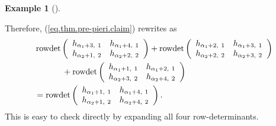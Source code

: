 \documentclass[numbers=enddot,12pt,final,onecolumn,notitlepage,english]{scrartcl}%
\theoremstyle{definition}
\newtheorem{exam}[theo]{Example}
\newenvironment{example}[1][]
{\begin{exam}[#1]\begin{leftbar}}
{\end{leftbar}\end{exam}}
\begin{document}
\begin{example}
Therefore, (\ref{eq.thm.pre-pieri.claim}) rewrites as%
\begin{align*}
&  \operatorname*{rowdet}\left(
\begin{array}
[c]{cc}%
h_{\alpha_{1}+3,\ 1} & h_{\alpha_{1}+4,\ 1}\\
h_{\alpha_{2}+1,\ 2} & h_{\alpha_{2}+2,\ 2}%
\end{array}
\right)  +\operatorname*{rowdet}\left(
\begin{array}
[c]{cc}%
h_{\alpha_{1}+2,\ 1} & h_{\alpha_{1}+3,\ 1}\\
h_{\alpha_{2}+2,\ 2} & h_{\alpha_{2}+3,\ 2}%
\end{array}
\right) \\
&  \ \ \ \ \ \ \ \ \ \ +\operatorname*{rowdet}\left(
\begin{array}
[c]{cc}%
h_{\alpha_{1}+1,\ 1} & h_{\alpha_{1}+2,\ 1}\\
h_{\alpha_{2}+3,\ 2} & h_{\alpha_{2}+4,\ 2}%
\end{array}
\right) \\
&  =\operatorname*{rowdet}\left(
\begin{array}
[c]{cc}%
h_{\alpha_{1}+1,\ 1} & h_{\alpha_{1}+4,\ 1}\\
h_{\alpha_{2}+1,\ 2} & h_{\alpha_{2}+4,\ 2}%
\end{array}
\right)  .
\end{align*}
This is easy to check directly by expanding all four row-determinants.
\end{example}
\end{document}
